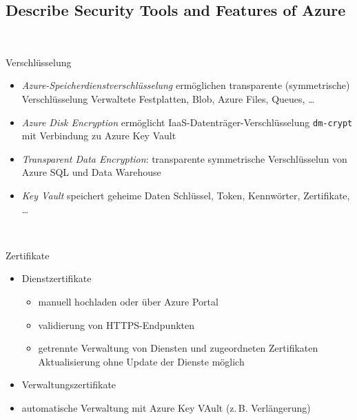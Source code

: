 \documentclass{scrartcl}
\newenvironment{flashcard}[2][]{%
    #1
    \vfill
    \centerline{\Large{#2}}
    \vfill
\newpage
}
{\newpage}
\newcommand{\subsectioncard}[1]{
    \vspace*{\stretch{1}}
    \subsection{#1}
    \vspace*{\stretch{1}}
    \pagebreak
}
\begin{document}
    \subsectioncard{Describe Security Tools and Features of Azure}

    \begin{flashcard}[\ ]{Verschlüsselung}
        \begin{itemize}
            \item \emph{Azure-Speicherdienstverschlüsselung} ermöglichen transparente (symmetrische) Verschlüsselung\newline
                Verwaltete Festplatten, Blob, Azure Files, Queues, \ldots
            \item \emph{Azure Disk Encryption} ermöglicht IaaS-Datenträger-Verschlüsselung\newline
                \texttt{dm-crypt} mit Verbindung zu Azure Key Vault
            \item \emph{Transparent Data Encryption}: transparente symmetrische Verschlüsselun von Azure SQL und Data Warehouse
            \item \emph{Key Vault} speichert geheime Daten\newline
                Schlüssel, Token, Kennwörter, Zertifikate, \ldots
        \end{itemize}
    \end{flashcard}

    \begin{flashcard}[\ ]{Zertifikate}
        \begin{itemize}
            \item Dienstzertifikate
            \begin{itemize}
                \item manuell hochladen oder über Azure Portal
                \item validierung von HTTPS-Endpunkten
                \item getrennte Verwaltung von Diensten und zugeordneten Zertifikaten\newline
                Aktualisierung ohne Update der Dienste möglich
            \end{itemize}
            \item Verwaltungszertifikate
            \item automatische Verwaltung mit Azure Key VAult (z.\,B. Verlängerung)
        \end{itemize}

    \end{flashcard}
\end{document}
